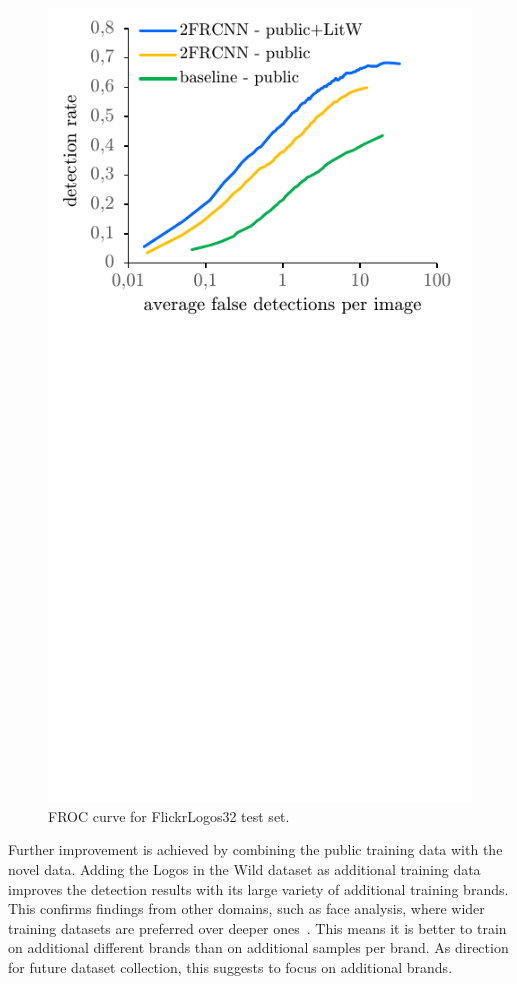 \documentclass[a4paper,twoside]{article}
\begin{document}
\begin{figure}%
\centering%
\includegraphics[width=\linewidth, trim=0cm 9cm 0cm 0cm, clip]{img/detectionFroc.pdf}%
\caption{FROC curve for FlickrLogos32 test set.}%
\label{fig:brandDistribution}
\end{figure}%
%

Further improvement is achieved by combining the public training data with the novel data.
Adding the Logos in the Wild dataset as additional training data improves the detection results with its large variety of additional training brands. 
This confirms findings from other domains, such as face analysis, where wider training datasets are preferred over deeper ones~\cite{bansal2017}. This means it is better to train on additional different brands than on additional samples per brand.
As direction for future dataset collection, this suggests to focus on additional brands.
\end{document}
